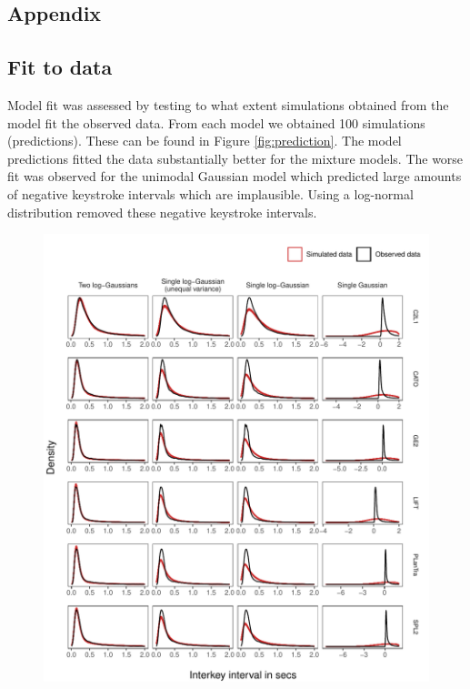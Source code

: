\clearpage
\makeatletter
\efloat@restorefloats
\makeatother


\begin{appendix}
\hypertarget{appendix}{%
\section{Appendix}\label{appendix}}

\hypertarget{fit-to-data}{%
\subsection{Fit to data}\label{fit-to-data}}

Model fit was assessed by testing to what extent simulations obtained
from the model fit the observed data. From each model we obtained 100
simulations (predictions). These can be found in Figure
\ref{fig:prediction}. The model predictions fitted the data
substantially better for the mixture models. The worse fit was observed
for the unimodal Gaussian model which predicted large amounts of
negative keystroke intervals which are implausible. Using a log-normal
distribution removed these negative keystroke intervals.

\begin{figure}

{\centering \includegraphics{figures/fitplots} 

}
\end{figure}
\end{appendix}
